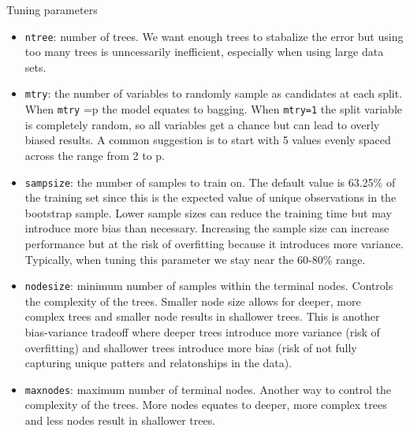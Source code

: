 \documentclass[
  10pt,
  ignorenonframetext,
]{beamer}
\providecommand{\tightlist}{%
  \setlength{\itemsep}{0pt}\setlength{\parskip}{0pt}}
\begin{document}
\begin{frame}[fragile]{Tuning parameters}
\protect\hypertarget{tuning-parameters}{}

\begin{itemize}
\tightlist
\item
  \texttt{ntree}: number of trees. We want enough trees to stabalize the
  error but using too many trees is unncessarily inefficient, especially
  when using large data sets.
\item
  \texttt{mtry}: the number of variables to randomly sample as
  candidates at each split. When \texttt{mtry} =p the model equates to
  bagging. When \texttt{mtry=1} the split variable is completely random,
  so all variables get a chance but can lead to overly biased results. A
  common suggestion is to start with 5 values evenly spaced across the
  range from 2 to p.
\item
  \texttt{sampsize}: the number of samples to train on. The default
  value is 63.25\% of the training set since this is the expected value
  of unique observations in the bootstrap sample. Lower sample sizes can
  reduce the training time but may introduce more bias than necessary.
  Increasing the sample size can increase performance but at the risk of
  overfitting because it introduces more variance. Typically, when
  tuning this parameter we stay near the 60-80\% range.
\item
  \texttt{nodesize}: minimum number of samples within the terminal
  nodes. Controls the complexity of the trees. Smaller node size allows
  for deeper, more complex trees and smaller node results in shallower
  trees. This is another bias-variance tradeoff where deeper trees
  introduce more variance (risk of overfitting) and shallower trees
  introduce more bias (risk of not fully capturing unique patters and
  relatonships in the data).
\item
  \texttt{maxnodes}: maximum number of terminal nodes. Another way to
  control the complexity of the trees. More nodes equates to deeper,
  more complex trees and less nodes result in shallower trees.
\end{itemize}

\end{frame}
\end{document}
